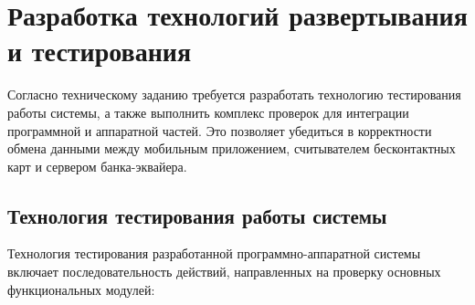 \newpage


%

\section{Разработка технологий развертывания и тестирования}
\label{sec:technolog}

Согласно техническому заданию требуется разработать технологию тестирования работы системы, а также выполнить комплекс проверок для интеграции программной и аппаратной частей.
Это позволяет убедиться в корректности обмена данными между мобильным приложением, считывателем бесконтактных карт и сервером банка-эквайера.

\subsection{Технология тестирования работы системы}
Технология тестирования разработанной программно-аппаратной системы включает последовательность действий, направленных на проверку основных функциональных модулей:

